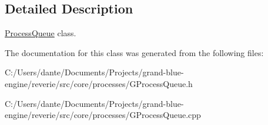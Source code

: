 \subsection{Detailed Description}
\mbox{\hyperlink{classrev_1_1_process_queue}{Process\+Queue}} class. 

The documentation for this class was generated from the following files\+:\begin{DoxyCompactItemize}
\item 
C\+:/\+Users/dante/\+Documents/\+Projects/grand-\/blue-\/engine/reverie/src/core/processes/G\+Process\+Queue.\+h\item 
C\+:/\+Users/dante/\+Documents/\+Projects/grand-\/blue-\/engine/reverie/src/core/processes/G\+Process\+Queue.\+cpp\end{DoxyCompactItemize}
